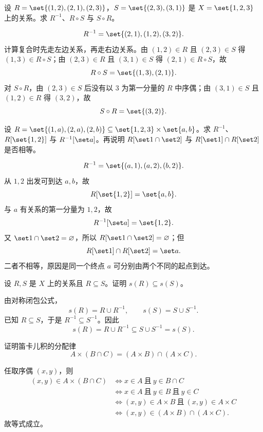 \begin{exercise}[level=advanced]
设 $R=\set{(1,2),(2,1),(2,3)}$，$S=\set{(2,3),(3,1)}$ 是 $X=\set{1,2,3}$ 上的关系。求 $R^{-1}$、$R\circ S$ 与 $S\circ R$。
\begin{solution}
\[
  R^{-1}=\set{(2,1),(1,2),(3,2)}.
  \]
  计算复合时先走左边关系，再走右边关系。由 $(1,2)\in R$ 且 $(2,3)\in S$ 得 $(1,3)\in R\circ S$；由 $(2,3)\in R$ 且 $(3,1)\in S$ 得 $(2,1)\in R\circ S$，故
  \[
  R\circ S=\set{(1,3),(2,1)}.
  \]
  对 $S\circ R$，由 $(2,3)\in S$ 后没有以 $3$ 为第一分量的 $R$ 中序偶；由 $(3,1)\in S$ 且 $(1,2)\in R$ 得 $(3,2)$，故
  \[
  S\circ R=\set{(3,2)}.
  \]
\end{solution}
\end{exercise}

\begin{exercise}[level=advanced]
设 $R=\set{(1,a),(2,a),(2,b)}\subseteq\set{1,2,3}\times\set{a,b}$。求 $R^{-1}$、$R[\set{1,2}]$ 与 $R^{-1}[\set a]$。再说明 $R[\set1\cap\set2]$ 与 $R[\set1]\cap R[\set2]$ 是否相等。
\begin{solution}
\[
  R^{-1}=\set{(a,1),(a,2),(b,2)}.
  \]
  从 $1,2$ 出发可到达 $a,b$，故
  \[
  R[\set{1,2}]=\set{a,b}.
  \]
  与 $a$ 有关系的第一分量为 $1,2$，故
  \[
  R^{-1}[\set a]=\set{1,2}.
  \]
  又 $\set1\cap\set2=\varnothing$，所以 $R[\set1\cap\set2]=\varnothing$；但
  \[
  R[\set1]\cap R[\set2]=\set a.
  \]
  二者不相等，原因是同一个终点 $a$ 可分别由两个不同的起点到达。
\end{solution}
\end{exercise}

\begin{exercise}[level=advanced]
设 $R,S$ 是 $X$ 上的关系且 $R\subseteq S$。证明 $s(R)\subseteq s(S)$。
\begin{solution}
由对称闭包公式，
  \[
  s(R)=R\cup R^{-1},\qquad s(S)=S\cup S^{-1}.
  \]
  已知 $R\subseteq S$，于是 $R^{-1}\subseteq S^{-1}$。因此
  \[
  s(R)=R\cup R^{-1}\subseteq S\cup S^{-1}=s(S).
  \]
\end{solution}
\end{exercise}

\begin{exercise}[level=advanced]
证明笛卡儿积的分配律
  \[
  A\times(B\cap C)=(A\times B)\cap(A\times C).
  \]
\begin{solution}
任取序偶 $(x,y)$，则
  \[
  \begin{aligned}
  (x,y)\in A\times(B\cap C)
  &\Longleftrightarrow x\in A\ \text{且}\ y\in B\cap C\\
  &\Longleftrightarrow x\in A\ \text{且}\ y\in B\ \text{且}\ y\in C\\
  &\Longleftrightarrow (x,y)\in A\times B\ \text{且}\ (x,y)\in A\times C\\
  &\Longleftrightarrow (x,y)\in(A\times B)\cap(A\times C).
  \end{aligned}
  \]
  故等式成立。
\end{solution}
\end{exercise}

